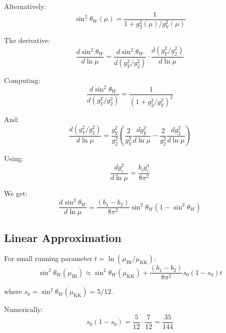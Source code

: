 \documentclass[11pt,a4paper]{article}
\begin{document}
Alternatively:
\begin{equation}
\label{eq:sin2-alt}
\sin^2\theta_W(\mu) = \frac{1}{1 + g_2^2(\mu)/g_Y^2(\mu)}
\end{equation}

The derivative:
\begin{equation}
\label{eq:sin2-deriv}
\frac{d\sin^2\theta_W}{d\ln\mu} = \frac{d\sin^2\theta_W}{d(g_Y^2/g_2^2)}\cdot\frac{d(g_Y^2/g_2^2)}{d\ln\mu}
\end{equation}

Computing:
\begin{equation}
\label{eq:deriv-computation}
\frac{d\sin^2\theta_W}{d(g_Y^2/g_2^2)} = \frac{1}{(1 + g_2^2/g_Y^2)^2}
\end{equation}

And:
\begin{equation}
\label{eq:ratio-deriv}
\frac{d(g_Y^2/g_2^2)}{d\ln\mu} = \frac{g_Y^2}{g_2^2}\left(\frac{2}{g_Y^2}\frac{dg_Y^2}{d\ln\mu} - \frac{2}{g_2^2}\frac{dg_2^2}{d\ln\mu}\right)
\end{equation}

Using:
\begin{equation}
\label{eq:dg2-dlnmu}
\frac{dg_i^2}{d\ln\mu} = \frac{b_i g_i^4}{8\pi^2}
\end{equation}

We get:
\begin{equation}
\label{eq:sin2-rg-final}
\frac{d\sin^2\theta_W}{d\ln\mu} = \frac{(b_1 - b_2)}{8\pi^2}\sin^2\theta_W(1 - \sin^2\theta_W)
\end{equation}

\subsection{Linear Approximation}
\label{subsec:linear}

For small running parameter $t = \ln(\mu_{\text{IR}}/\mu_{\text{KK}})$:
\begin{equation}
\label{eq:sin2-linear}
\sin^2\theta_W(\mu_{\text{IR}}) \approx \sin^2\theta_W(\mu_{\text{KK}}) + \frac{(b_1 - b_2)}{8\pi^2}s_0(1-s_0)t
\end{equation}

where $s_0 = \sin^2\theta_W(\mu_{\text{KK}}) = 5/12$.

Numerically:
\begin{equation}
\label{eq:sin2-coeff}
s_0(1-s_0) = \frac{5}{12}\cdot\frac{7}{12} = \frac{35}{144}
\end{equation}
\end{document}
